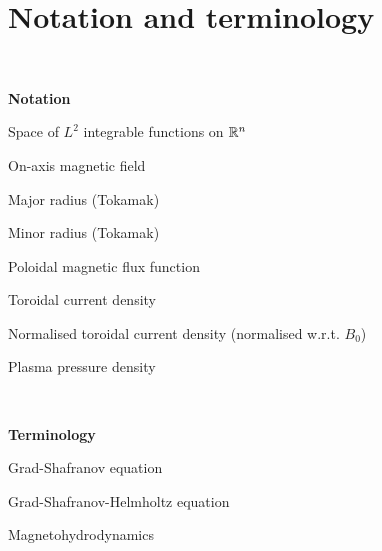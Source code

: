 

\chapter{Notation and terminology}\label{notation}

\renewcommand{\thefootnote}{\fnsymbol{footnote}}


\

\noindent\textbf{Notation}


\newcommand{\nttn}[2]{\item[{\ \makebox[3.18cm][l]{#1}}]{#2}}
\begin{list}{}{ \setlength{\leftmargin}{3.4cm}
                \setlength{\labelwidth}{3.4cm}}

\nttn{$L^2(\R^n)$}{Space of $L^2$ integrable functions on $\mathbb{R}^n$}

\nttn{$B_0$}{On-axis magnetic field}
\nttn{$R_0$}{Major radius (Tokamak)}
\nttn{$a$}{Minor radius (Tokamak)}
\nttn{$\Psi$}{Poloidal magnetic flux function}
\nttn{$j_{\phi}$}{Toroidal current density}
\nttn{$J_{\phi}$}{Normalised toroidal current density (normalised w.r.t. $B_0$)}
\nttn{$p$}{Plasma pressure density}

\end{list}

\

\noindent\textbf{Terminology}


\newcommand{\term}[2]{\item[{\ \makebox[4.58cm][l]{#1}}]{#2}}
\begin{list}{}{ \setlength{\leftmargin}{4.8cm}
                \setlength{\labelwidth}{4.8cm}}


\term{GS / GSE}{Grad-Shafranov equation}
\term{GSH}{Grad-Shafranov-Helmholtz equation}
\term{MHD}{Magnetohydrodynamics}


\end{list}
